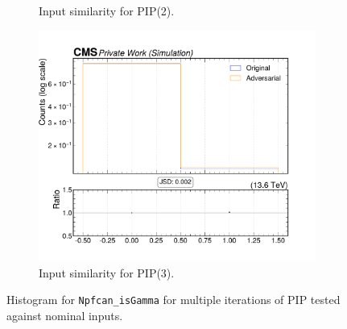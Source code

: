 \begin{figure}[htbp]
\begin{subfigure}[t]{0.32\textwidth}
    \caption{Input similarity for PIP(2).}
  \end{subfigure}\hfill
  \begin{subfigure}[t]{0.32\textwidth}
    \includegraphics[width=\linewidth]{media/output/features/compare/intprob_3/cmp_npf_arr_Npfcan_isGamma.pdf}
    \caption{Input similarity for PIP(3).}
  \end{subfigure}

  \caption{Histogram for \texttt{Npfcan\_isGamma} for multiple iterations of PIP tested against nominal inputs.}
  \label{fig:intprob_input_Npfcan_isGamma}
\end{figure}
